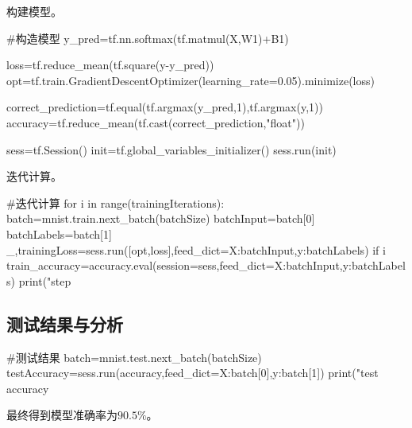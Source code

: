 构建模型。
\begin{python}
  #构造模型
  y_pred=tf.nn.softmax(tf.matmul(X,W1)+B1)

  loss=tf.reduce_mean(tf.square(y-y_pred))
  opt=tf.train.GradientDescentOptimizer(learning_rate=0.05).minimize(loss)

  correct_prediction=tf.equal(tf.argmax(y_pred,1),tf.argmax(y,1))
  accuracy=tf.reduce_mean(tf.cast(correct_prediction,"float"))

  sess=tf.Session()
  init=tf.global_variables_initializer()
  sess.run(init)
\end{python}

迭代计算。
\begin{python}
  #迭代计算
  for i in range(trainingIterations):
      batch=mnist.train.next_batch(batchSize)
      batchInput=batch[0]
      batchLabels=batch[1]
      _,trainingLoss=sess.run([opt,loss],feed_dict={X:batchInput,y:batchLabels})
      if i%
          train_accuracy=accuracy.eval(session=sess,feed_dict={X:batchInput,y:batchLabels})
          print("step %
\end{python}

\subsection{测试结果与分析}
\begin{python}
  #测试结果
  batch=mnist.test.next_batch(batchSize)
  testAccuracy=sess.run(accuracy,feed_dict={X:batch[0],y:batch[1]})
  print("test accuracy %
\end{python}
最终得到模型准确率为$90.5\%$。



